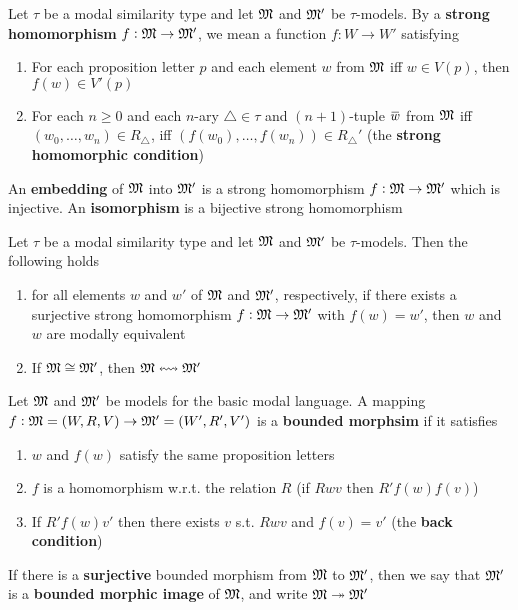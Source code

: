 \documentclass[11pt]{article}
\begin{document}
\begin{definition}
Let \(\tau\) be a modal similarity type and let \(\mathfrak{M}\) and \(\mathfrak{M}'\) be
\(\tau\)-models. By a \textbf{strong homomorphism} \(f:\mathfrak{M}\to\mathfrak{M}'\), we mean a function \(f:W\to
    W'\) satisfying
\begin{enumerate}
\item For each proposition letter \(p\) and each element \(w\) from \(\mathfrak{M}\) iff
\(w\in V(p)\), then \(f(w)\in V'(p)\)
\item For each \(n\ge0\) and each \(n\)-ary \(\triangle\in\tau\) and
\((n+1)\)-tuple \(\bbar{w}\) from \(\mathfrak{M}\) iff \((w_0,\dots,w_n)\in
       R_{\triangle}\), iff \((f(w_0),\dots,f(w_n))\in R_{\triangle}'\) (the
\textbf{strong homomorphic condition})
\end{enumerate}


An \textbf{embedding} of \(\mathfrak{M}\) into \(\mathfrak{M}'\) is a strong homomorphism
\(f:\mathfrak{M}\to\mathfrak{M}'\) which is injective. An \textbf{isomorphism} is a bijective strong homomorphism
\end{definition}

\begin{proposition}[]
Let \(\tau\) be a modal similarity type and let \(\mathfrak{M}\) and \(\mathfrak{M}'\) be
\(\tau\)-models. Then the following holds
\begin{enumerate}
\item for all elements \(w\) and \(w'\) of \(\mathfrak{M}\) and \(\mathfrak{M}'\), respectively,
if there exists a surjective strong homomorphism \(f:\mathfrak{M}\to\mathfrak{M}'\) with
\(f(w)=w'\), then \(w\) and \(w\) are modally equivalent
\item If \(\mathfrak{M}\cong\mathfrak{M}'\), then \(\mathfrak{M}\leftrightsquigarrow\mathfrak{M}'\)
\end{enumerate}
\end{proposition}

\begin{definition}
Let \(\mathfrak{M}\) and \(\mathfrak{M}'\) be models for the basic modal language. A mapping
\(f:\mathfrak{M}=(W,R,V)\to\mathfrak{M}'=(W',R',V')\) is a \textbf{bounded morphsim} if it satisfies
\begin{enumerate}
\item \(w\) and \(f(w)\) satisfy the same proposition letters
\item \(f\) is a homomorphism w.r.t. the relation \(R\) (if \(Rwv\) then \(R'f(w)f(v)\))
\item If \(R'f(w)v'\) then there exists \(v\) s.t. \(Rwv\) and \(f(v)=v'\) (the
\textbf{back condition})
\end{enumerate}


If there is a \textbf{surjective} bounded morphism from \(\mathfrak{M}\) to \(\mathfrak{M}'\), then we
say that \(\mathfrak{M}'\) is a \textbf{bounded morphic image} of \(\mathfrak{M}\), and write
\(\mathfrak{M}\twoheadrightarrow\mathfrak{M}'\)
\end{definition}
\end{document}
